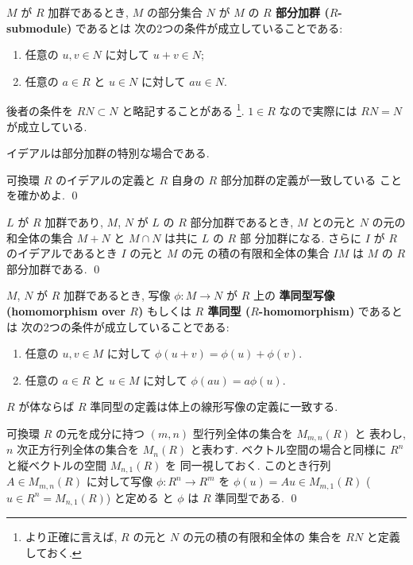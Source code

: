 \documentclass[12pt,twoside]{jarticle}
\begin{document}

$M$ が $R$ 加群であるとき, $M$ の部分集合 $N$ が $M$ 
の {\bf $R$ 部分加群 ($R$-submodule)} であるとは
次の2つの条件が成立していることである:
\begin{enumerate}
\item 任意の $u,v\in N$ に対して $u+v\in N$;
\item 任意の $a\in R$ と $u\in N$ に対して $au\in N$.
\end{enumerate}
後者の条件を $RN\subset N$ と略記することがある%
\footnote{より正確に言えば, $R$ の元と $N$ の元の積の有限和全体の
  集合を $RN$ と定義しておく.}.
$1\in R$ なので実際には $RN=N$ が成立している.

イデアルは部分加群の特別な場合である.


\begin{question}
  可換環 $R$ のイデアルの定義と $R$ 自身の $R$ 部分加群の定義が一致している
  ことを確かめよ. 
  \qed
\end{question}


\begin{question}
  $L$ が $R$ 加群であり, $M$, $N$ が $L$ の $R$ 部分加群であるとき, 
  $M$ との元と $N$ の元の和全体の集合 $M+N$ と $M\cap N$ は共に $L$ の $R$ 部
  分加群になる.  さらに $I$ が $R$ のイデアルであるとき $I$ の元と $M$ の元
  の積の有限和全体の集合 $IM$ は $M$ の $R$ 部分加群である.
  \qed
\end{question}

\medskip

$M$, $N$ が $R$ 加群であるとき, 写像 $\phi:M\to N$ が $R$ 上の
{\bf 準同型写像 (homomorphism over $R$)} もしくは
{\bf $R$ 準同型 ($R$-homomorphism)} であるとは
次の2つの条件が成立していることである:
\begin{enumerate}
\item 任意の $u,v\in M$ に対して $\phi(u+v)=\phi(u)+\phi(v)$.
\item 任意の $a\in R$ と $u\in M$ に対して $\phi(au)=a\phi(u)$.
\end{enumerate}
$R$ が体ならば $R$ 準同型の定義は体上の線形写像の定義に一致する.


\begin{question}
  可換環 $R$ の元を成分に持つ $(m,n)$ 型行列全体の集合を $M_{m,n}(R)$ と
  表わし, $n$ 次正方行列全体の集合を $M_n(R)$ と表わす.
  ベクトル空間の場合と同様に $R^n$ と縦ベクトルの空間 $M_{n,1}(R)$ を
  同一視しておく.
  このとき行列 $A\in M_{m,n}(R)$ に対して写像 $\phi:R^n\to R^m$ 
  を $\phi(u)=Au\in M_{m,1}(R)$ ($u\in R^n=M_{n,1}(R)$) と定める
  と $\phi$ は $R$ 準同型である.
  \qed
\end{question}
\end{document}
